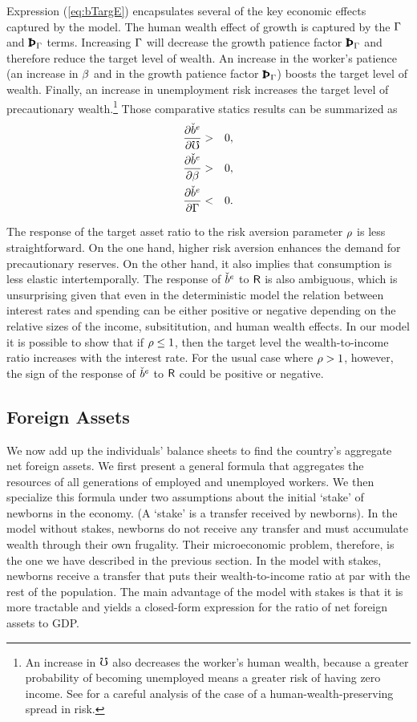 \documentclass[titlepage,abstract,letterpaper]{econtex}
\begin{document}
Expression (\ref{eq:bTargE}) encapsulates several of the key economic
effects captured by the model.  The human wealth effect of growth is
captured by the $\Gamma$ and $\PatPGro$ terms. Increasing $\Gamma$ will
decrease the growth patience factor $\PatPGro$ and therefore reduce the
target level of wealth.  An increase in the worker's
patience (an increase in $\beta$ and in the growth patience factor
$\PatPGro$) boosts the target level of wealth.  Finally, an increase in
unemployment risk increases the target level of precautionary wealth.\footnote{An increase in $\mho$ also decreases the worker's human wealth, because a greater probability of becoming unemployed means a greater risk of having zero income.  See \cite{ctDiscrete} for a careful analysis of the case of a human-wealth-preserving spread in risk.}
Those comparative statics results can be summarized as
\begin{eqnarray}
\frac{\partial \check{b}^{e}}{\partial \mho}   & > & 0, \label{eq:compstat}
\\ \frac{\partial \check{b}^{e}}{\partial \beta} & >& 0, \nonumber
\\ \frac{\partial \check{b}^{e}}{\partial \Gamma} & <& 0. \nonumber
\end{eqnarray}

The response of the target asset ratio to the risk aversion parameter
$\rho$ is less straightforward. On the one hand, higher risk aversion
enhances the demand for precautionary reserves. On the other hand, it
also implies that consumption is less elastic intertemporally.  The
response of $\check{b}^{e}$ to $\mathsf{R}$ is also ambiguous, which is
unsurprising given that even in the deterministic model the relation
between interest rates and spending can be either positive or negative
depending on the relative sizes of the income, subsititution, and
human wealth effects.  In our model it is possible to show that if
$\rho \leq 1$, then the target level the wealth-to-income ratio
increases with the interest rate. For the usual case where $\rho >1$,
however, the sign of the response of $\check{b}^{e}$ to $\mathsf{R}$ could be
positive or negative.


\subsection{Foreign Assets}

We now add up the individuals' balance sheets to find the country's
aggregate net foreign assets. We first present a general formula that
aggregates the resources of all generations of employed and unemployed
workers. We then specialize this formula under two assumptions about
the initial `stake' of newborns in the economy.  (A `stake' is a
transfer received by newborns). In the model without stakes, newborns
do not receive any transfer and must accumulate wealth through their
own frugality. Their microeconomic problem, therefore, is the one we
have described in the previous section. In the model with stakes,
newborns receive a transfer that puts their wealth-to-income ratio at
par with the rest of the population. The main advantage of the model
with stakes is that it is more tractable and yields a closed-form
expression for the ratio of net foreign assets to GDP.
\end{document}
